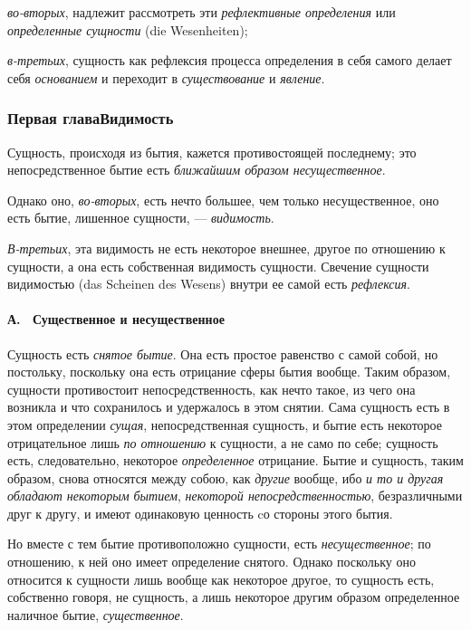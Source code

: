 {\em во-вторых}, надлежит рассмотреть эти
{\em рефлективные определения} или
{\em определенные сущности} (die Wesenheiten);

{\em в-третьих}, сущность как рефлексия процесса
определения в себя самого делает себя {\em основанием}
и переходит в {\em существование} и
{\em явление}.

\subsubsection{Первая главаВидимость}
Сущность, происходя из бытия, кажется
противостоящей последнему; это непосредственное бытие есть
{\em ближайшим образом несущественное}.

Однако оно, {\em во-вторых}, есть нечто большее, чем
только несущественное, оно есть бытие, лишенное сущности, —
{\em видимость}.

{\em В-третьих}, эта видимость не есть некоторое
внешнее, другое по отношению к сущности, а она есть собственная видимость
сущности. Свечение сущности видимостью (das Scheinen des Wesens) внутри ее
самой есть {\em рефлексия}.

\paragraph[А. \ Существенное и несущественное]{А. \ Существенное и
несущественное}
Сущность есть {\em снятое
бытие}. Она есть простое равенство с самой собой, но постольку, поскольку
она есть отрицание сферы бытия вообще. Таким образом, сущности противостоит
непосредственность, как нечто такое, из чего она возникла и что сохранилось
и удержалось в этом снятии. Сама сущность есть в этом определении
{\em сущая}, непосредственная сущность, и бытие есть
некоторое отрицательное лишь {\em по отношению} к
сущности, а не само по себе; сущность есть, следовательно, некоторое
{\em определенное} отрицание. Бытие и сущность, таким
образом, снова относятся между собою, как {\em другие}
вообще, ибо {\em и то и другая обладают некоторым
бытием}, {\em некоторой непосредственностью},
безразличными друг к другу, и имеют одинаковую ценность cо стороны этого
бытия.

Но вместе с тем бытие противоположно сущности, есть
{\em несущественное}; по отношению, к ней оно имеет
определение снятого. Однако поскольку оно относится к сущности лишь вообще
как некоторое другое, то сущность есть, собственно говоря, не сущность, а
лишь некоторое другим образом определенное наличное бытие,
{\em существенное}.

